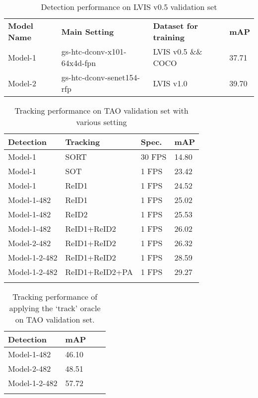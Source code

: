 \documentclass[runningheads]{llncs}
\begin{document}
\begin{table*}
\begin{center}

\caption{Detection performance on LVIS v0.5 validation set}
\label{detection}
\begin{tabular}{l   l   l   l}
\hline\noalign{\smallskip}
\textbf{Model Name} & \textbf{Main Setting} & \textbf{Dataset for training} & \textbf{mAP} \\
\noalign{\smallskip}
\hline
\noalign{\smallskip}
Model-1 & gs-htc-dconv-x101-64x4d-fpn & LVIS v0.5 {\&\&} COCO & 37.71\\
Model-2 & gs-htc-dconv-senet154-rfp & LVIS v1.0 & 39.70\footnotemark[1] \\
\hline
\end{tabular}
\end{center}
\end{table*}


\begin{table}
\tabcolsep=3pt
\begin{center}
\caption{Tracking performance on TAO validation set with various setting}
\label{tracking}
\begin{tabular}{l   l   l   l }
\hline\noalign{\smallskip}
\textbf{Detection} & \textbf{Tracking} & \textbf{Spec.} & \textbf{mAP} \\
\hline
Model-1 & SORT & 30 FPS & 14.80 \\
Model-1 & SOT  & 1 FPS & 23.42 \\
Model-1 & ReID1   & 1 FPS & 24.52 \\
Model-1-482 & ReID1  & 1 FPS & 25.02 \\
Model-1-482 & ReID2  & 1 FPS & 25.53 \\
Model-1-482 & ReID1+ReID2  & 1 FPS & 26.02 \\
Model-2-482 & ReID1+ReID2 & 1 FPS & 26.32 \\
Model-1-2-482 & ReID1+ReID2 & 1 FPS & 28.59 \\
Model-1-2-482 & ReID1+ReID2+PA & 1 FPS & 29.27 \\
\noalign{\smallskip}
\hline
\end{tabular}
\end{center}
\end{table}

\begin{table}
\tabcolsep=20pt
\begin{center}
\caption{Tracking performance of applying the `track' oracle on TAO validation set.}
\label{oracle}
\begin{tabular}{l   l   l   l }
\hline\noalign{\smallskip}
\textbf{Detection}  & \textbf{mAP} \\
\hline
Model-1-482  & 46.10 \\
Model-2-482 & 48.51 \\
Model-1-2-482 & 57.72 \\
\noalign{\smallskip}
\hline
\end{tabular}
\end{center}
\end{table}
\end{document}

